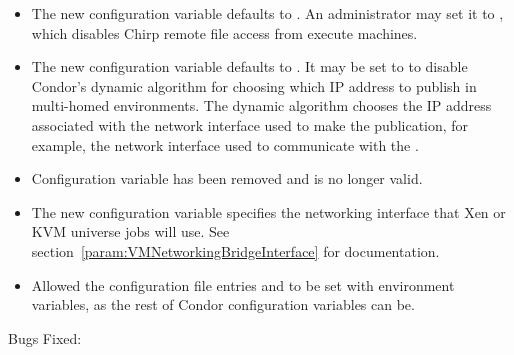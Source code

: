 \begin{itemize}

\item The new configuration variable  
defaults to . 
An administrator may set it to , which 
disables Chirp remote file access from execute machines.

\item The new configuration variable
   defaults to .  It may
  be set to  to disable Condor's dynamic algorithm for choosing
  which IP address to publish in multi-homed environments.  The dynamic
  algorithm chooses the IP address associated with the network interface
  used to make the publication, for example, the network interface used 
  to communicate with the .

\item Configuration variable  has been removed
  and is no longer valid.

\item The new configuration variable
   specifies the networking interface
  that Xen or KVM  universe jobs will use.
  See section~\ref{param:VMNetworkingBridgeInterface} for documentation.

\item
Allowed the configuration file entries 
and  to be set with environment variables,
as the rest of Condor configuration variables can be.

\end{itemize}

\noindent Bugs Fixed:

